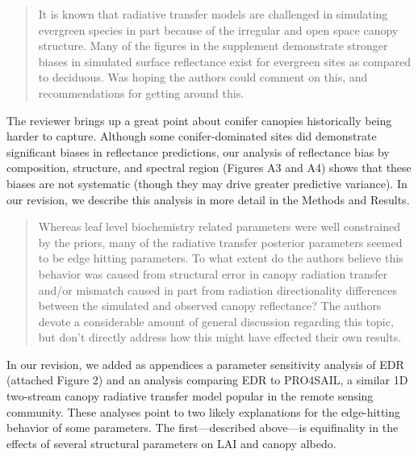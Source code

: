 
\begin{quote}
  It is known that radiative transfer models are challenged in simulating evergreen species in part because of the irregular and open space canopy structure. Many of the figures in the supplement demonstrate stronger biases in simulated surface reflectance exist for evergreen sites as compared to deciduous. Was hoping the authors could comment on this, and recommendations for getting around this.
\end{quote}

The reviewer brings up a great point about conifer canopies historically being harder to capture. Although some conifer-dominated sites did demonstrate significant biases in reflectance predictions, our analysis of reflectance bias by composition, structure, and spectral region (Figures A3 and A4) shows that these biases are not systematic (though they may drive greater predictive variance). In our revision, we describe this analysis in more detail in the Methods and Results.


\begin{quote}
  Whereas leaf level biochemistry related parameters were well constrained by the priors, many of the radiative transfer posterior parameters seemed to be edge hitting parameters. To what extent do the authors believe this behavior was caused from structural error in canopy radiation transfer and/or mismatch caused in part from radiation directionality differences between the simulated and observed canopy reflectance? The authors devote a considerable amount of general discussion regarding this topic, but don’t directly address how this might have effected their own results.
\end{quote}

In our revision, we added as appendices a parameter sensitivity analysis of EDR (attached Figure 2) and an analysis comparing EDR to PRO4SAIL, a similar 1D two-stream canopy radiative transfer model popular in the remote sensing community. These analyses point to two likely explanations for the edge-hitting behavior of some parameters. The first---described above---is equifinality in the effects of several structural parameters on LAI and canopy albedo.

